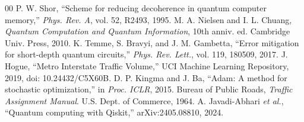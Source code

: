 \documentclass[conference]{IEEEtran}
\begin{document}
\begin{thebibliography}{00}
 P. W. Shor, ``Scheme for reducing decoherence in quantum computer memory,'' \emph{Phys. Rev. A}, vol. 52, R2493, 1995.
 M. A. Nielsen and I. L. Chuang, \emph{Quantum Computation and Quantum Information}, 10th anniv. ed. Cambridge Univ. Press, 2010.
 K. Temme, S. Bravyi, and J. M. Gambetta, ``Error mitigation for short-depth quantum circuits,'' \emph{Phys. Rev. Lett.}, vol. 119, 180509, 2017.
 J. Hogue, ``Metro Interstate Traffic Volume,'' UCI Machine Learning Repository, 2019, doi: 10.24432/C5X60B.
 D. P. Kingma and J. Ba, ``Adam: A method for stochastic optimization,'' in \emph{Proc. ICLR}, 2015.
 Bureau of Public Roads, \emph{Traffic Assignment Manual}. U.S. Dept. of Commerce, 1964.
 A. Javadi-Abhari \emph{et al.}, ``Quantum computing with Qiskit,'' arXiv:2405.08810, 2024.
\end{thebibliography}
\end{document}
